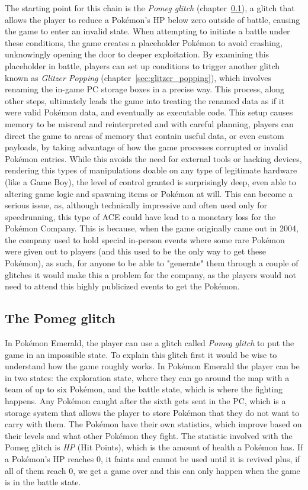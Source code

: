 \documentclass[a4paper]{usiinfbachelorproject}
\begin{document}
The starting point for this chain is the \textit{Pomeg glitch} (chapter~\ref{sec:pomeg_glitch}), a glitch that allows the player to reduce a Pokémon’s HP below zero outside of battle, causing the game to enter an invalid state. When attempting to initiate a battle under these conditions, the game creates a placeholder Pokémon to avoid crashing, unknowingly opening the door to deeper exploitation. By examining this placeholder in battle, players can set up conditions to trigger another glitch known as \textit{Glitzer Popping} (chapter~\ref{sec:glitzer_popping}), which involves renaming the in-game PC storage boxes in a precise way. This process, along other steps, ultimately leads the game into treating the renamed data as if it were valid Pokémon data, and eventually as executable code.
This setup causes memory to be misread and reinterpreted and with careful planning, players can direct the game to areas of memory that contain useful data, or even custom payloads, by taking advantage of how the game processes corrupted or invalid Pokémon entries. While this avoids the need for external tools or hacking devices, rendering this types of manipulations doable on any type of legitimate hardware (like a Game Boy), the level of control granted is surprisingly deep, even able to altering game logic and spawning items or Pokémon at will.
This can become a serious issue, as, although technically impressive and often used only for speedrunning, this type of ACE could have lead to a monetary loss for the Pokémon Company. This is because, when the game originally came out in 2004, the company used to hold special in-person events where some rare Pokémon were given out to players (and this used to be the only way to get these Pokémon), as such, for anyone to be able to "generate" them through a couple of glitches it would make this a problem for the company, as the players would not need to attend this highly publicized events to get the Pokémon.


\subsection{The Pomeg glitch}
\label{sec:pomeg_glitch}
In Pokémon Emerald, the player can use a glitch called \textit{Pomeg glitch} to put the game in an impossible state. To explain this glitch first it would be wise to understand how the game roughly works. In Pokémon Emerald the player can be in two states: the exploration state, where they can go around the map with a team of up to six Pokémon, and the battle state, which is where the fighting happens. Any Pokémon caught after the sixth gets sent in the PC, which is a storage system that allows the player to store Pokémon that they do not want to carry with them. The Pokémon have their own statistics, which improve based on their levels and what other Pokémon they fight. The statistic involved with the Pomeg glitch is \textit{HP} (Hit Points), which is the amount of health a Pokémon has. If a Pokémon's HP reaches 0, it faints and cannot be used until it is revived plus, if all of them reach 0, we get a game over and this can only happen when the game is in the battle state.
\end{document}
